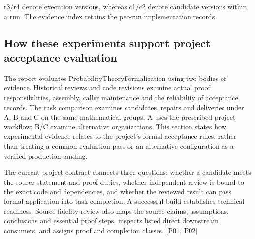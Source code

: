 r3/r4 denote execution versions, whereas c1/c2 denote candidate versions within a run. The evidence index retains the per-run implementation records.

\subsection[How these experiments support project acceptance evaluation]{\texorpdfstring{\protect\hypertarget{n2}{}How these experiments support project acceptance evaluation}{How these experiments support project acceptance evaluation}}
The report evaluates ProbabilityTheoryFormalization using two bodies of evidence. Historical reviews and code revisions examine actual proof responsibilities, assembly, caller maintenance and the reliability of acceptance records. The task comparison examines candidates, repairs and deliveries under A, B and C on the same mathematical groups. A uses the prescribed project workflow; B/C examine alternative organizations. This section states how experimental evidence relates to the project's formal acceptance rules, rather than treating a common-evaluation pass or an alternative configuration as a verified production landing.

The current project contract connects three questions: whether a candidate meets the source statement and proof duties, whether independent review is bound to the exact code and dependencies, and whether the reviewed result can pass formal application into task completion. A successful build establishes technical readiness. Source-fidelity review also maps the source claims, assumptions, conclusions and essential proof steps, inspects listed direct downstream consumers, and assigns proof and completion classes. [P01, P02]

